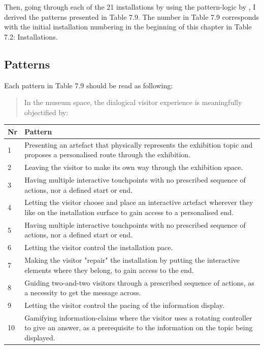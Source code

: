 \break
Then, going through each of the 21 installations by using the pattern-logic by \autocite{Alexander_book}, I derived the patterns presented in Table 7.9. The number in Table 7.9 corresponds with the initial installation numbering in the beginning of this chapter in Table 7.2: Installations.

\subsection{Patterns}
Each pattern in Table 7.9 should be read as following:

\begin{quote}
    In the museum space, the dialogical visitor experience is meaningfully objectified by:
\end{quote}

\begin{table}[H]
\centering
\begin{tabular}{| p{0.75cm} | p{11cm}| }
\hline
\textbf{Nr} & \textbf{Pattern}\\
\hline
1 & Presenting an artefact that physically represents the exhibition topic and proposes a personalised route through the exhibition.\\
\hline
2 & Leaving the visitor to make its own way through the exhibition space.\\
\hline
3 & Having multiple interactive touchpoints with no prescribed sequence of actions, nor a defined start or end.\\
\hline
4 & Letting the visitor choose and place an interactive artefact wherever they like on the installation surface to gain access to a personalised end.\\
\hline
5 & Having multiple interactive touchpoints with no prescribed sequence of actions, nor a defined start or end.\\
\hline
6 & Letting the visitor control the installation pace.\\
\hline
7 & Making the visitor "repair" the installation by putting the interactive elements where they belong, to gain access to the end.\\
\hline
8 & Guiding two-and-two visitors through a prescribed sequence of actions, as a necessity to get the message across.\\
\hline
9 & Letting the visitor control the pacing of the information display.\\
\hline
10 & Gamifying information-claims where the visitor uses a rotating controller to give an answer, as a prerequisite to the information on the topic being displayed.\\

\end{tabular}
\end{table}
